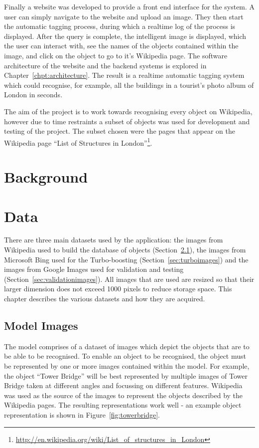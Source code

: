 \documentclass[11pt, onecolumn, a4paper, final]{report} %
\begin{document}
Finally a website was developed to provide a front end interface for the system. A user can simply navigate to the website and upload an image. They then start the automatic tagging process, during which a realtime log of the process is displayed. After the query is complete, the intelligent image is displayed, which the user can interact with, see the names of the objects contained within the image, and click on the object to go to it's Wikipedia page. The software architecture of the website and the backend systems is explored in Chapter~\ref{chpt:architecture}. The result is a realtime automatic tagging system which could recognise, for example, all the buildings in a tourist's photo album of London in seconds.

The aim of the project is to work towards recognising every object on Wikipedia, however due to time restraints a subset of objects was used for development and testing of the project. The subset chosen were the pages that appear on the Wikipedia page ``List of Structures in London''\footnote{\url{http://en.wikipedia.org/wiki/List_of_structures_in_London}}.
	

\chapter{Background}
\label{chpt:background}


\chapter{Data}
\label{chpt:data}
There are three main datasets used by the application: the images from Wikipedia used to build the database of objects (Section~\ref{sec:modelimages}), the images from Microsoft Bing used for the Turbo-boosting (Section~\ref{sec:turboimages}) and the images from Google Images used for validation and testing (Section~\ref{sec:validationimages}). All images that are used are resized so that their larger dimension does not exceed 1000 pixels to reduce storage space. This chapter describes the various datasets and how they are acquired.

\section{Model Images}
\label{sec:modelimages}
The model comprises of a dataset of images which depict the objects that are to be able to be recognised. To enable an object to be recognised, the object must be represented by one or more images contained within the model. For example, the object ``Tower Bridge'' will be best represented by multiple images of Tower Bridge taken at different angles and focussing on different features. Wikipedia was used as the source of the images to represent the objects described by the Wikipedia pages. The resulting representations work well - an example object representation is shown in Figure~\ref{fig:towerbridge}.
\end{document}
